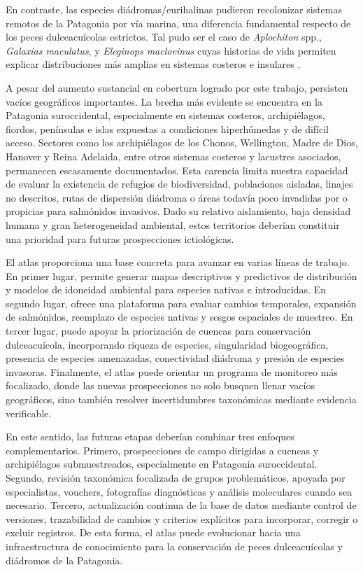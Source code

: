 \documentclass[sn-apa,pdflatex]{sn-jnl}
\begin{document}
En contraste, las especies diádromas/eurihalinas pudieron recolonizar
sistemas remotos de la Patagonia por vía marina, una diferencia
fundamental respecto de los peces dulceacuícolas estrictos. Tal pudo ser
el caso de \emph{Aplochiton} spp., \emph{Galaxias maculatus}, y
\emph{Eleginops maclovinus} cuyas historias de vida permiten explicar
distribuciones más amplias en sistemas costeros e insulares
\citep{Gorski2018, aloOtolithMicrochemistryDiadromy2019, delgadoEffectsDiadromyIts2019, astorgaContrastingPatternsGenetic2022, ceballosGeneticRelationshipsAtlantic2015}.

A pesar del aumento sustancial en cobertura logrado por este trabajo,
persisten vacíos geográficos importantes. La brecha más evidente se
encuentra en la Patagonia suroccidental, especialmente en sistemas
costeros, archipiélagos, fiordos, penínsulas e islas expuestas a
condiciones hiperhúmedas y de difícil acceso. Sectores como los
archipiélagos de los Chonos, Wellington, Madre de Dios, Hanover y Reina
Adelaida, entre otros sistemas costeros y lacustres asociados,
permanecen escasamente documentados. Esta carencia limita nuestra
capacidad de evaluar la existencia de refugios de biodiversidad,
poblaciones aisladas, linajes no descritos, rutas de dispersión diádroma
o áreas todavía poco invadidas por o propicias para salmónidos
invasivos. Dado su relativo aislamiento, baja densidad humana y gran
heterogeneidad ambiental, estos territorios deberían constituir una
prioridad para futuras prospecciones ictiológicas.

El atlas proporciona una base concreta para avanzar en varias líneas de
trabajo. En primer lugar, permite generar mapas descriptivos y
predictivos de distribución y modelos de idoneidad ambiental para
especies nativas e introducidas. En segundo lugar, ofrece una plataforma
para evaluar cambios temporales, expansión de salmónidos, reemplazo de
especies nativas y sesgos espaciales de muestreo. En tercer lugar, puede
apoyar la priorización de cuencas para conservación dulceacuícola,
incorporando riqueza de especies, singularidad biogeográfica, presencia
de especies amenazadas, conectividad diádroma y presión de especies
invasoras. Finalmente, el atlas puede orientar un programa de monitoreo
más focalizado, donde las nuevas prospecciones no solo busquen llenar
vacíos geográficos, sino también resolver incertidumbres taxonómicas
mediante evidencia verificable.

En este sentido, las futuras etapas deberían combinar tres enfoques
complementarios. Primero, prospecciones de campo dirigidas a cuencas y
archipiélagos submuestreados, especialmente en Patagonia suroccidental.
Segundo, revisión taxonómica focalizada de grupos problemáticos, apoyada
por especialistas, vouchers, fotografías diagnósticas y análisis
moleculares cuando sea necesario. Tercero, actualización continua de la
base de datos mediante control de versiones, trazabilidad de cambios y
criterios explícitos para incorporar, corregir o excluir registros. De
esta forma, el atlas puede evolucionar hacia una infraestructura de
conocimiento para la conservación de peces dulceacuícolas y diádromos de
la Patagonia.
\end{document}
